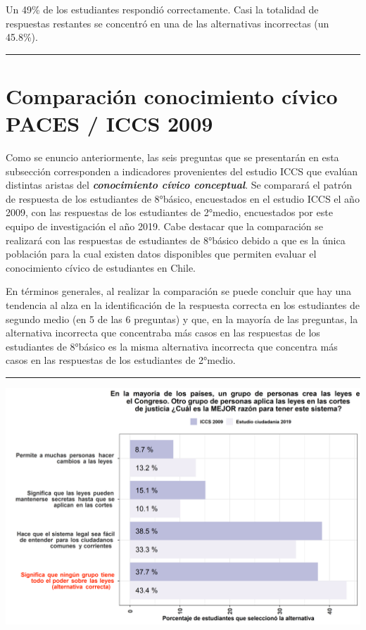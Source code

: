 \documentclass[
  14pt,
]{book}
\let\origfigure\figure
\let\endorigfigure\endfigure
\renewenvironment{figure}[1][2] {
  \expandafter\origfigure\expandafter[H]
} {
  \endorigfigure
}
\begin{document}
Un 49\% de los estudiantes respondió correctamente. Casi la totalidad de respuestas restantes se concentró en una de las alternativas incorrectas (un 45.8\%).

\begin{center}\rule{0.5\linewidth}{0.5pt}\end{center}

\hypertarget{comparaciuxf3n-conocimiento-cuxedvico-paces-iccs-2009}{%
\section{Comparación conocimiento cívico PACES / ICCS 2009}\label{comparaciuxf3n-conocimiento-cuxedvico-paces-iccs-2009}}

Como se enuncio anteriormente, las seis preguntas que se presentarán en esta subsección corresponden a indicadores provenientes del estudio ICCS que evalúan distintas aristas del \textbf{\emph{conocimiento cívico conceptual}}. Se comparará el patrón de respuesta de los estudiantes de 8°básico, encuestados en el estudio ICCS el año 2009, con las respuestas de los estudiantes de 2°medio, encuestados por este equipo de investigación el año 2019. Cabe destacar que la comparación se realizará con las respuestas de estudiantes de 8°básico debido a que es la única población para la cual existen datos disponibles que permiten evaluar el conocimiento cívico de estudiantes en Chile.

En términos generales, al realizar la comparación se puede concluir que hay una tendencia al alza en la identificación de la respuesta correcta en los estudiantes de segundo medio (en 5 de las 6 preguntas) y que, en la mayoría de las preguntas, la alternativa incorrecta que concentraba más casos en las respuestas de los estudiantes de 8°básico es la misma alternativa incorrecta que concentra más casos en las respuestas de los estudiantes de 2°medio.

\begin{center}\rule{0.5\linewidth}{0.5pt}\end{center}

\begin{figure}[!ht]

{\centering \includegraphics[width=0.8\linewidth,]{images/graph_p1} 

}

\caption{Comparación con ICCS: Razones para crear leyes en el Congreso}\label{fig:unnamed-chunk-19}
\end{figure}
\end{document}
